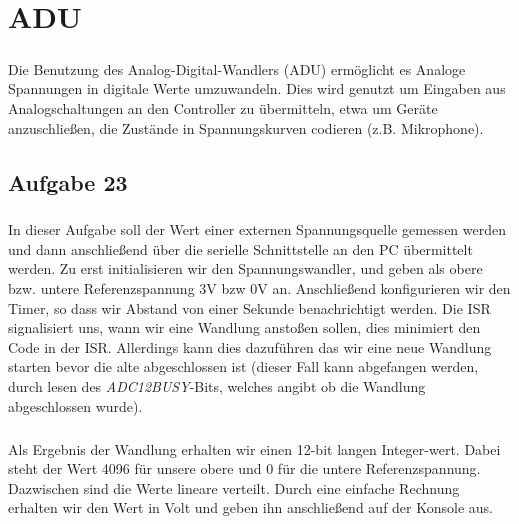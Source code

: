 \chapter{ADU}

\paragraph*{}
Die Benutzung des Analog-Digital-Wandlers (ADU) ermöglicht es Analoge Spannungen in digitale Werte umzuwandeln. Dies wird genutzt um Eingaben aus Analogschaltungen an den Controller zu übermitteln, etwa um Geräte anzuschließen, die Zustände in Spannungskurven codieren (z.B. Mikrophone).

\section{Aufgabe 23}

\paragraph*{}
In dieser Aufgabe soll der Wert einer externen Spannungsquelle gemessen werden und dann anschließend über die serielle Schnittstelle an den PC übermittelt werden. Zu erst initialisieren wir den Spannungswandler, und geben als obere bzw. untere Referenzspannung 3V bzw 0V an. Anschließend konfigurieren wir den Timer, so dass wir Abstand von einer Sekunde benachrichtigt werden. Die ISR signalisiert uns, wann wir eine Wandlung anstoßen sollen, dies minimiert den Code in der ISR. Allerdings kann dies dazuführen das wir eine neue Wandlung starten bevor die alte abgeschlossen ist (dieser Fall kann abgefangen werden, durch lesen des {\em ADC12BUSY}-Bits, welches angibt ob die Wandlung abgeschlossen wurde).



\paragraph*{}
Als Ergebnis der Wandlung erhalten wir einen 12-bit langen Integer-wert. Dabei steht der Wert 4096 für unsere obere und 0 für die untere Referenzspannung. Dazwischen sind die Werte lineare verteilt. Durch eine einfache Rechnung erhalten wir den Wert in Volt und geben ihn anschließend auf der Konsole aus.



